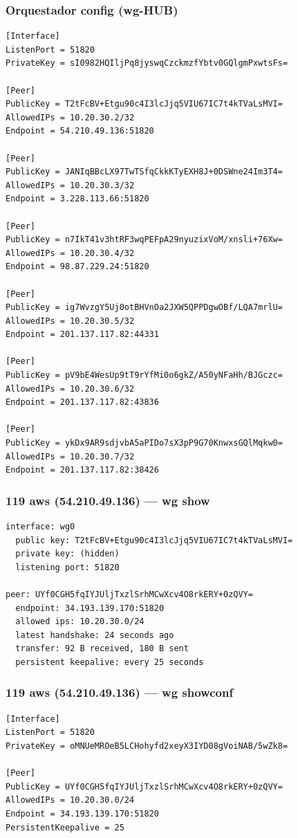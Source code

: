 \documentclass[11pt,a4paper]{article}
\begin{document}
\subsubsection*{Orquestador config (wg-HUB)}
\begin{lstlisting}
[Interface]
ListenPort = 51820
PrivateKey = sI0982HQIljPq8jyswqCzckmzfYbtv0GQlgmPxwtsFs=

[Peer]
PublicKey = T2tFcBV+Etgu90c4I3lcJjq5VIU67IC7t4kTVaLsMVI=
AllowedIPs = 10.20.30.2/32
Endpoint = 54.210.49.136:51820

[Peer]
PublicKey = JANIqBBcLX97TwTSfqCkkKTyEXH8J+0DSWne24Im3T4=
AllowedIPs = 10.20.30.3/32
Endpoint = 3.228.113.66:51820

[Peer]
PublicKey = n7IkT41v3htRF3wqPEFpA29nyuzixVoM/xnsli+76Xw=
AllowedIPs = 10.20.30.4/32
Endpoint = 98.87.229.24:51820

[Peer]
PublicKey = ig7WvzgY5Uj0otBHVnOa2JXW5QPPDgwOBf/LQA7mrlU=
AllowedIPs = 10.20.30.5/32
Endpoint = 201.137.117.82:44331

[Peer]
PublicKey = pV9bE4WesUp9tT9rYfMi0o6gkZ/A50yNFaHh/BJGczc=
AllowedIPs = 10.20.30.6/32
Endpoint = 201.137.117.82:43836

[Peer]
PublicKey = ykDx9AR9sdjvbA5aPIDo7sX3pP9G70KnwxsGQlMqkw0=
AllowedIPs = 10.20.30.7/32
Endpoint = 201.137.117.82:38426

\end{lstlisting}

\subsubsection*{119 aws (54.210.49.136) — wg show}
\begin{lstlisting}
interface: wg0
  public key: T2tFcBV+Etgu90c4I3lcJjq5VIU67IC7t4kTVaLsMVI=
  private key: (hidden)
  listening port: 51820

peer: UYf0CGH5fqIYJUljTxzlSrhMCwXcv4O8rkERY+0zQVY=
  endpoint: 34.193.139.170:51820
  allowed ips: 10.20.30.0/24
  latest handshake: 24 seconds ago
  transfer: 92 B received, 180 B sent
  persistent keepalive: every 25 seconds

\end{lstlisting}

\subsubsection*{119 aws (54.210.49.136) — wg showconf}
\begin{lstlisting}
[Interface]
ListenPort = 51820
PrivateKey = oMNUeMROeB5LCHohyfd2xeyX3IYD08gVoiNAB/5wZk8=

[Peer]
PublicKey = UYf0CGH5fqIYJUljTxzlSrhMCwXcv4O8rkERY+0zQVY=
AllowedIPs = 10.20.30.0/24
Endpoint = 34.193.139.170:51820
PersistentKeepalive = 25

\end{lstlisting}
\end{document}
